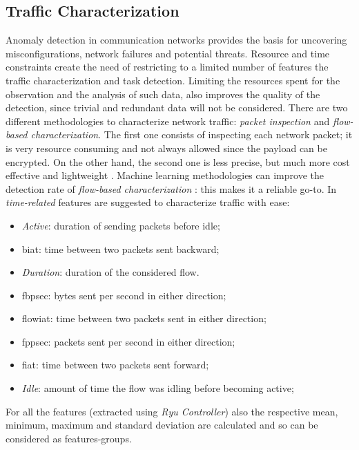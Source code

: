 

\subsection{Traffic Characterization}
\label{subsec:traffic-characterization}

Anomaly detection in communication networks provides the basis for uncovering misconfigurations, network failures and potential threats. Resource and time constraints create the need of restricting to a limited number of features the traffic characterization and task detection. Limiting the resources spent for the observation and the analysis of such data, also improves the quality of the detection, since trivial and redundant data will not be considered. There are two different methodologies to characterize network traffic: \textit{packet inspection} and \textit{flow-based characterization}. The first one consists of inspecting each network packet; it is very resource consuming and not always allowed since the payload can be encrypted. On the other hand, the second one is less precise, but much more cost effective and lightweight \cite{Alaidaros2017}. Machine learning methodologies can improve the detection rate of \textit{flow-based characterization} \cite{Iglesias2015}: this makes it a reliable go-to. In \cite{icissp17} \textit{time-related} features are suggested to characterize traffic with ease:
\begin{itemize}
    \item[\faCaretRight] \textit{Active}: duration of sending packets before idle;
    \item[\faCaretRight] \gls{biat}: time between two packets sent backward;
    \item[\faCaretRight] \textit{Duration}: duration of the considered flow.
    \item[\faCaretRight] \gls{fbpsec}: bytes sent per second in either direction;
    \item[\faCaretRight] \gls{flowiat}: time between two packets sent in either direction; 
    \item[\faCaretRight] \gls{fppsec}: packets sent per second in either direction;
    \item[\faCaretRight] \gls{fiat}: time between two packets sent forward; 
    \item[\faCaretRight] \textit{Idle}: amount of time the flow was idling before becoming active;
\end{itemize}
For all the features (extracted using \textit{Ryu Controller}) also the respective mean, minimum, maximum and standard deviation are calculated and so can be considered as features-groups. \\
\lipsum[1-3]

